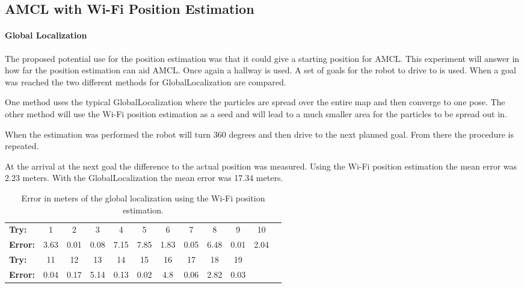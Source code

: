 \begin{tabular}{l*{10}{c}r}

\end{tabular}
\subsection{AMCL with Wi-Fi Position Estimation}\label{sec:wifiposamcl}
\paragraph{Global Localization}
The proposed potential use for the position estimation was that it could give a starting position for AMCL. This experiment will answer in how far the position estimation can aid AMCL. Once again a hallway is used. A set of goals for the robot to drive to is used. When a goal was reached the two different methods for \gls{GlobalLocalization} are compared. 

One method uses the typical \gls{GlobalLocalization} where the particles are spread over the entire map and then converge to one pose. The other method will use the Wi-Fi position estimation as a seed and will lead to a much smaller area for the particles to be spread out in. 

When the estimation was performed the robot will turn 360 degrees and then drive to the next planned goal. From there the procedure is repeated. 

At the arrival at the next goal the difference to the actual position was measured. Using the Wi-Fi position estimation the mean error was 2.23 meters. With the \gls{GlobalLocalization} the mean error was 17.34 meters. 

\begin{table} \label{table:exp2wpe}
\caption{Error in meters of the global localization using the Wi-Fi position estimation.}
\begin{tabular}{l*{10}{c}r}
  \hline			
  \bf Try: & 1 & 2 & 3 & 4 & 5 & 6 & 7 & 8 & 9 & 10 \\
  \bf Error: & 3.63 & 0.01 & 0.08 & 7.15 & 7.85 & 1.83 & 0.05 & 6.48 & 0.01 & 2.04 \\
  \hline  
    \bf Try: & 11 & 12 & 13 & 14 & 15 & 16 & 17 & 18 & 19 \\
    \bf Error: & 0.04 & 0.17 & 5.14 & 0.13 & 0.02 & 4.8 & 0.06 & 2.82 & 0.03 \\
    \hline  
\end{tabular}
\end{table}

